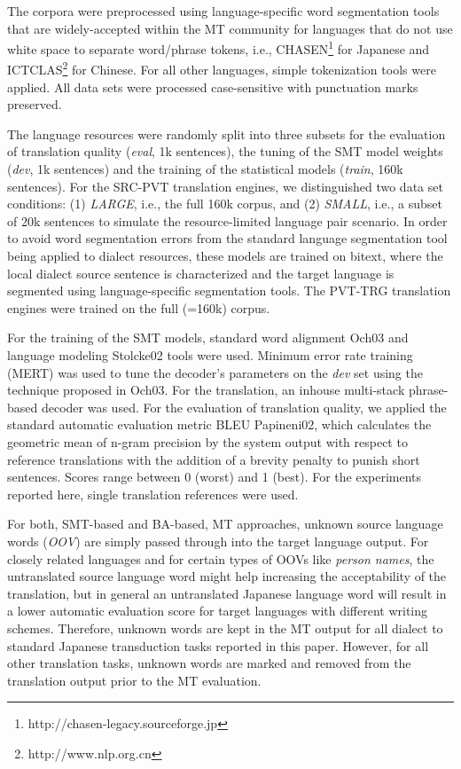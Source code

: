 \documentclass[english]{jnlp_1.4}
\renewcommand{\shortcite}{}
\begin{document}
 The corpora were preprocessed using language-specific word segmentation tools
 that are widely-accepted within the MT community for languages that do not use white space to separate word/phrase tokens,
 i.e., CHASEN\footnote{http://chasen-legacy.sourceforge.jp} for Japanese and ICTCLAS\footnote{http://www.nlp.org.cn} for Chinese.
 For all other languages, simple tokenization tools were applied.
 All data sets were processed case-sensitive with punctuation marks preserved.

 The language resources were randomly split into three subsets for the evaluation of translation quality
 ({\em eval}, 1k sentences), the tuning of the SMT model weights ({\em dev}, 1k sentences) and
 the training of the statistical models ({\em train}, 160k sentences).
 For the SRC-PVT translation engines, we distinguished two data set conditions:
 (1) {\em\small LARGE}, i.e., the full 160k corpus, and
 (2) {\em\small SMALL}, i.e., a subset of 20k sentences to simulate the resource-limited language pair scenario.
 In order to avoid word segmentation errors from the standard language segmentation tool being applied to dialect resources,
 these models are trained on bitext, where the local dialect source sentence is characterized and the target language is
 segmented using language-specific segmentation tools. The PVT-TRG translation engines were trained on the full (=160k) corpus.

 For the training of the SMT models, standard word alignment \shortcite{Och03}
 and language modeling \shortcite{Stolcke02} tools were used.
 Minimum error rate training (MERT) was used to tune the decoder's parameters on the {\em dev} set
 using the technique proposed in \shortcite{Och03}.
 For the translation, an inhouse multi-stack phrase-based decoder was used.
 For the evaluation of translation quality, we applied the standard automatic evaluation metric
 BLEU \shortcite{Papineni02}, which calculates the geometric mean of n-gram precision by the system output with respect
 to reference translations with the addition of a brevity penalty to punish short sentences.
 Scores range between 0 (worst) and 1 (best). For the experiments reported here, single translation references were used.

 For both, SMT-based and BA-based, MT approaches, unknown source language words (\textit{OOV}) are simply passed through into the target language output.
 For closely related languages and for certain types of OOVs like {\em person names}, the untranslated source language word might help increasing the acceptability
 of the translation, but in general an untranslated Japanese language word will result in a lower automatic evaluation score for target languages with different writing schemes.
 Therefore, unknown words are kept in the MT output for all dialect to standard Japanese transduction tasks reported in this paper.
 However, for all other translation tasks, unknown words are marked and removed from the translation output prior to the MT evaluation.
\end{document}
